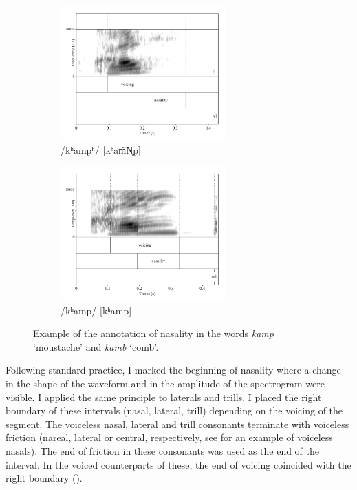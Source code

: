 \documentclass[11pt,a4paper,oneside,openany]{memoir}\usepackage[]{graphicx}\usepackage[]{color}
\begin{document}
\begin{figure}
\begin{subfigure}{\textwidth}
\centering
\includegraphics[width=0.7\textwidth]{kamp}
\caption{/kʰampʰ/ [kʰam͡N̥p]}
\label{f:kamp}
\end{subfigure}
\begin{subfigure}{\textwidth}
\centering
\includegraphics[width=0.7\textwidth]{kamb}
\caption{/kʰamp/ [kʰamp]}
\label{f:kamb}
\end{subfigure}
\caption[Annotation of nasality]{Example of the annotation of nasality in the words \textit{kamp} `moustache' and \textit{kamb} `comb'.
}
\label{f:nasality}
\end{figure}

Following standard practice, I marked the beginning of nasality where a change in the shape of the waveform and in the amplitude of the spectrogram were visible.
I applied the same principle to laterals and trills.
I placed the right boundary of these intervals (nasal, lateral, trill) depending on the voicing of the segment.
The voiceless nasal, lateral and trill consonants terminate with voiceless friction (nareal, lateral or central, respectively, see  for an example of voiceless nasals).
The end of friction in these consonants was used as the end of the interval.
In the voiced counterparts of these, the end of voicing coincided with the right boundary ().
\end{document}

